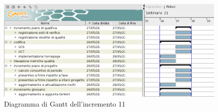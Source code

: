 \pagebreak
{}
\begin{figure}[!ht]
    \caption{Diagramma di Gantt dell'incremento 11}
    \vspace{5px}
    \includegraphics[scale=0.3]{../../../Images/Diagrammi/Gantt/incremento11.png}
    \centering
\end{figure}

